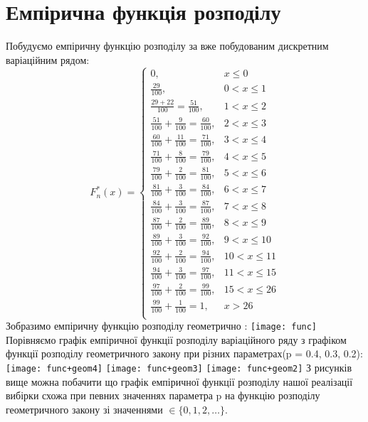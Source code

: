 \documentclass{article}
\begin{document}
\section{Емпірична функція розподілу}
Побудуємо емпіричну функцію розподілу за вже побудованим 
дискретним варіаційним рядом:
\newline
$$F_n^*(x) = \begin{cases}
  0,  & x \leq 0 \\
  \frac{29}{100}, & 0 < x \leq 1 \\
  \frac{29 + 22}{100} = \frac{51}{100}, & 1 < x \leq 2 \\
  \frac{51}{100} + \frac{9}{100} = \frac{60}{100}, & 2 < x \leq 3 \\
  \frac{60}{100} + \frac{11}{100} = \frac{71}{100}, & 3 < x \leq 4 \\
  \frac{71}{100} + \frac{8}{100} = \frac{79}{100}, & 4 < x \leq 5 \\
  \frac{79}{100} + \frac{2}{100} = \frac{81}{100}, & 5 < x \leq 6 \\
  \frac{81}{100} + \frac{3}{100} = \frac{84}{100}, & 6 < x \leq 7 \\
  \frac{84}{100} + \frac{3}{100} = \frac{87}{100}, & 7 < x \leq 8 \\
  \frac{87}{100} + \frac{2}{100} = \frac{89}{100}, & 8 < x \leq 9 \\
  \frac{89}{100} + \frac{3}{100} = \frac{92}{100}, & 9 < x \leq 10 \\
  \frac{92}{100} + \frac{2}{100} = \frac{94}{100}, & 10 < x \leq 11 \\
  \frac{94}{100} + \frac{3}{100} = \frac{97}{100}, & 11 < x \leq 15 \\
  \frac{97}{100} + \frac{2}{100} = \frac{99}{100}, & 15 < x \leq 26 \\
  \frac{99}{100} + \frac{1}{100} = 1, & x > 26 \\
\end{cases}$$
\newpage
Зобразимо емпіричну функцію розподілу геометрично :
\newline
\texttt{[image: func]}
\newline
Порівняємо графік емпіричної функції розподілу варіаційного ряду 
з графіком функції розподілу геометричного закону при 
різних параметрах(p = 0.4, 0.3, 0.2):
\newline
\texttt{[image: func+geom4]}
\newline
\texttt{[image: func+geom3]}
\newline
\texttt{[image: func+geom2]}
\newline
З рисунків вище можна побачити що графік емпіричної функції
розподілу нашої реалізації вибірки схожа при певних значеннях
параметра p на функцію розподілу геометричного закону зі 
значеннями $\in \{ 0, 1, 2, \dots \} $.
\end{document}
